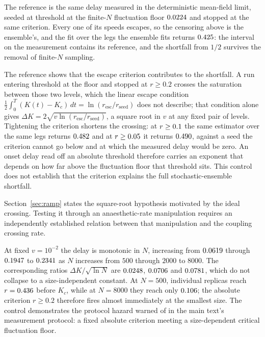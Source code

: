 \documentclass{article}
\begin{document}
The reference is the same
delay measured in the deterministic mean-field limit, seeded at threshold at the
finite-$N$ fluctuation floor $0.0224$ and stopped at the same
criterion.  Every one of its \quasistaticSpeedCount{} speeds escapes, so the
censoring above is the ensemble's, and the fit over the
\quasistaticUncensoredCount{} legs the ensemble fits returns
$0.425$: the interval on the measurement contains its
reference, and the shortfall from $1/2$ survives the removal of finite-$N$
sampling.

The reference shows that the escape criterion contributes to the shortfall. A run
entering threshold at the floor and stopped at $r\geq 0.2$ crosses the
saturation between those two levels, which the linear escape condition
$\tfrac12\int_0^{T}(K(t)-K_c)\,dt=\ln(r_{\mathrm{esc}}/r_{\mathrm{seed}})$ does
not describe; that condition alone gives
$\Delta K=2\sqrt{v\ln(r_{\mathrm{esc}}/r_{\mathrm{seed}})}$, a square root in
$v$ at any fixed pair of levels.  Tightening the criterion shortens the crossing:
at $r\geq0.1$ the same estimator over the same legs returns
$0.482$ and at $r\geq0.05$ it returns
$0.490$, against a seed the criterion cannot go below
and at which the measured delay would be zero.  An onset delay read off an
absolute threshold therefore carries an exponent that depends on how far above
the fluctuation floor that threshold sits. This control does not establish that
the criterion explains the full stochastic-ensemble shortfall.

Section~\ref{sec:ramp} states the square-root hypothesis motivated by the
ideal crossing. Testing it through an anaesthetic-rate manipulation requires
an independently established relation between that manipulation and the
coupling crossing rate.

At fixed $v=10^{-2}$ the delay is monotonic in $N$, increasing
from $0.0619$ through $0.1947$ to $0.2341$ as $N$ increases from $500$ through
$2000$ to $8000$. The corresponding ratios $\Delta K / \sqrt{\ln N}$ are $0.0248$, $0.0706$ and $0.0781$, which do not collapse to a size-independent constant. At $N=500$, individual replicas reach $r=0.436$ before $K_c$, while at $N=8000$ they reach only $0.106$; the absolute criterion $r \geq 0.2$ therefore fires almost immediately at the smallest size. The control demonstrates the protocol hazard warned of in the main text's measurement protocol: a fixed absolute criterion meeting a size-dependent critical fluctuation floor.
\end{document}
